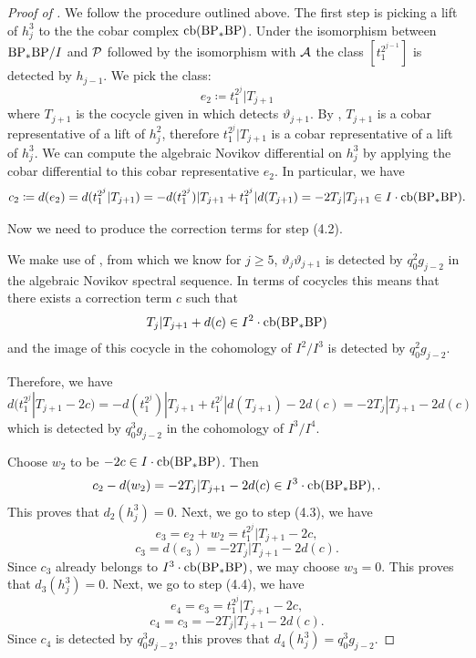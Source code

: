 \begin{proof}[Proof of ]
  We follow the procedure outlined above.
  The first step is picking a lift of $h_j^3$ to the the cobar complex $\mathrm{cb}(\BP_*\BP)$. Under the isomorphism between $\BP_*\BP/I$ and $\P$ followed by the isomorphism with $\A$ the class
  $[t_1^{2^{j-1}}]$ is detected by $h_{j-1}$.  
  We pick the class:
  \[ e_2 \coloneqq t_1^{2^{j}} | T_{j+1} \]
  where $T_{j+1}$ is the cocycle given in  which detects $\vartheta_{j+1}$. By , $T_{j+1}$ is a cobar representative of a lift of $h_{j}^2$, therefore $t_1^{2^{j}} | T_{j+1}$ is a cobar representative of a lift of $h_j^3$.
  We can compute the algebraic Novikov differential on $h_j^3$ by applying the cobar differential to this cobar representative $e_2$. In particular, we have
  \[ c_2 \coloneqq d(e_2) = d( t_1^{2^{j}} | T_{j+1} ) =  -d(t_1^{2^{j}}) | T_{j+1} + t_1^{2^{j}} | d(T_{j+1}) = -2T_j|T_{j+1} \in I \cdot \mathrm{cb}(\BP_*\BP). \]

  Now we need to produce the correction terms for step (4.2).
  
  We make use of , from which we know for $j \geq 5$, $\vartheta_j\vartheta_{j+1}$ is detected by $q_0^2g_{j-2}$ in the algebraic Novikov spectral sequence. In terms of cocycles this means that there exists a correction term $c$ such that 
  $$T_j|T_{j+1} + d(c) \in I^2 \cdot \mathrm{cb}(\BP_*\BP)$$ 
  and the image of this cocycle in the cohomology of $I^2/I^3$ is detected by $q_0^2g_{j-2}$.

  Therefore, we have
  \[ d(t_1^{2^{j}} | T_{j+1}   - 2c) =  -d(t_1^{2^{j}})|T_{j+1} + t_1^{2^{j}} | d(T_{j+1}) - 2d(c) = -2T_j|T_{j+1} - 2d(c) \]
  which is detected by $q_0^3g_{j-2}$ in the cohomology of $I^3/I^4$. 
  
  Choose $w_2 $ to be $-2c \in I \cdot \mathrm{cb}(\BP_*\BP)$. Then
  $$c_2 - d(w_2) = -2T_j|T_{j+1} - 2d(c) \in I^{3} \cdot \mathrm{cb}(\BP_*\BP),.$$
  This proves that $d_2(h_j^3) = 0$. Next, we go to step (4.3), we have
  $$e_3 = e_2 + w_2 = t_1^{2^{j}} | T_{j+1}   - 2c,$$ 
  $$c_3 = d(e_3) = -2T_j|T_{j+1} - 2d(c).$$
  Since $c_3$ already belongs to $I^{3} \cdot \mathrm{cb}(\BP_*\BP)$, we may choose $w_3=0$. This proves that $d_3(h_j^3) = 0$.  Next, we go to step (4.4), we have 
  $$e_4=e_3= t_1^{2^{j}} | T_{j+1}   - 2c,$$
  $$c_4 = c_3 = -2T_j|T_{j+1} - 2d(c).$$
  Since $c_4$ is detected by $q_0^3g_{j-2}$, this proves that $d_4(h_j^3) = q_0^3 g_{j-2}$.
 

\end{proof}
